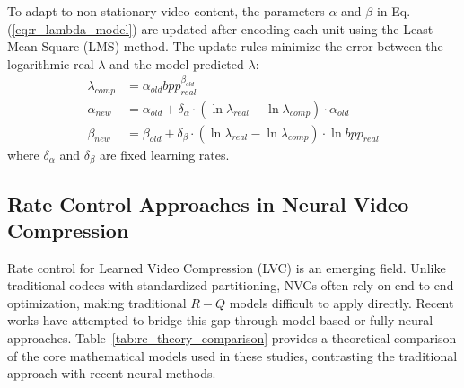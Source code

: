 To adapt to non-stationary video content, the parameters $\alpha$ and $\beta$ in Eq. (\ref{eq:r_lambda_model}) are updated after encoding each unit using the Least Mean Square (LMS) method. The update rules minimize the error between the logarithmic real $\lambda$ and the model-predicted $\lambda$:
\begin{align}
    \lambda_{comp} &= \alpha_{old}bpp^{\beta_{old}}_{real} \\
    \alpha_{new} &= \alpha_{old} + \delta_{\alpha} \cdot (\ln \lambda_{real} - \ln \lambda_{comp}) \cdot \alpha_{old} \\
    \beta_{new} &= \beta_{old} + \delta_{\beta} \cdot (\ln \lambda_{real} - \ln \lambda_{comp}) \cdot \ln bpp_{real}
\end{align}
where $\delta_{\alpha}$ and $\delta_{\beta}$ are fixed learning rates.

\subsection{Rate Control Approaches in Neural Video Compression}

Rate control for Learned Video Compression (LVC) is an emerging field. Unlike traditional codecs with standardized partitioning, NVCs often rely on end-to-end optimization, making traditional $R-Q$ models difficult to apply directly. Recent works have attempted to bridge this gap through model-based or fully neural approaches.
Table~\ref{tab:rc_theory_comparison} provides a theoretical comparison of the core mathematical models used in these studies, contrasting the traditional approach with recent neural methods.

